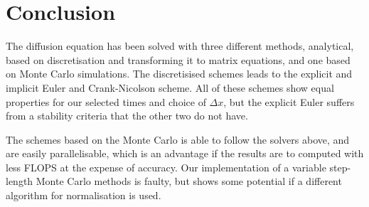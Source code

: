 \documentclass[11pt,a4paper,final]{article}
\numberwithin{equation}{section}
\begin{document}
\section{Conclusion}

The diffusion equation has been solved with three different methods, 
analytical, based on discretisation and transforming it to matrix 
equations, and one based on Monte Carlo simulations. The discretisised 
schemes leads to the explicit and implicit Euler and Crank-Nicolson scheme.
All of these schemes show equal properties for our selected times and 
choice of $\Delta x$, but the explicit Euler suffers from a stability 
criteria that the other two do not have. 

The schemes based on the Monte Carlo is able to follow the solvers above, 
and are easily parallelisable, which is an advantage if the results
are to computed with less FLOPS at the expense of accuracy. Our 
implementation of a variable step-length Monte Carlo methods is faulty, 
but shows some potential if a different algorithm for normalisation is 
used.



\printbibliography
\end{document}
